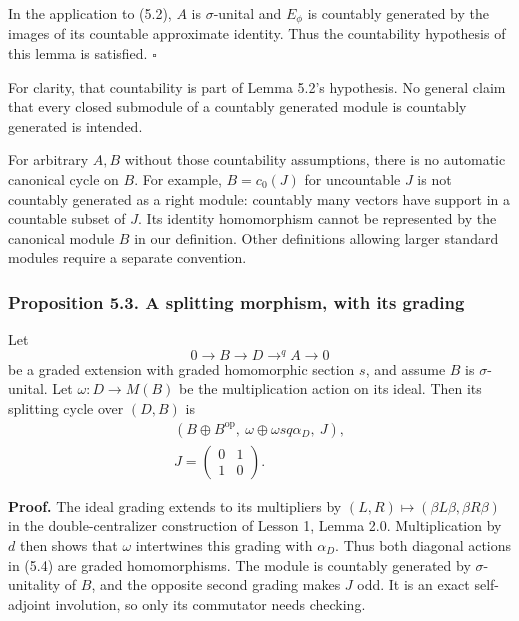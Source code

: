 \documentclass[
  11pt,
]{article}
\begin{document}
In the application to (5.2), \(A\) is \(\sigma\)-unital and \(E_\phi\)
is countably generated by the images of its countable approximate
identity. Thus the countability hypothesis of this lemma is satisfied.
\(\square\)

For clarity, that countability is part of Lemma 5.2's hypothesis. No
general claim that every closed submodule of a countably generated
module is countably generated is intended.

For arbitrary \(A,B\) without those countability assumptions, there is
no automatic canonical cycle on \(B\). For example, \(B=c_0(J)\) for
uncountable \(J\) is not countably generated as a right module:
countably many vectors have support in a countable subset of \(J\). Its
identity homomorphism cannot be represented by the canonical module
\(B\) in our definition. Other definitions allowing larger standard
modules require a separate convention.

\subsubsection{Proposition 5.3. A splitting morphism, with its
grading}\label{proposition-5.3.-a-splitting-morphism-with-its-grading}

Let \[
0\longrightarrow B\longrightarrow D
\mathop{\longrightarrow}^{q}A\longrightarrow0
\] be a graded extension with graded homomorphic section \(s\), and
assume \(B\) is \(\sigma\)-unital. Let \(\omega:D\to M(B)\) be the
multiplication action on its ideal. Then its splitting cycle over
\((D,B)\) is \[
\begin{gathered}
(B\oplus B^{\mathrm{op}},\ \omega\oplus\omega sq\alpha_D,\ J),\\
J=\begin{pmatrix}0&1\\1&0\end{pmatrix}.
\end{gathered}
\tag{5.4}
\]

\textbf{Proof.} The ideal grading extends to its multipliers by
\((L,R)\mapsto(\beta L\beta,\beta R\beta)\) in the double-centralizer
construction of Lesson 1, Lemma 2.0. Multiplication by \(d\) then shows
that \(\omega\) intertwines this grading with \(\alpha_D\). Thus both
diagonal actions in (5.4) are graded homomorphisms. The module is
countably generated by \(\sigma\)-unitality of \(B\), and the opposite
second grading makes \(J\) odd. It is an exact self-adjoint involution,
so only its commutator needs checking.
\end{document}

